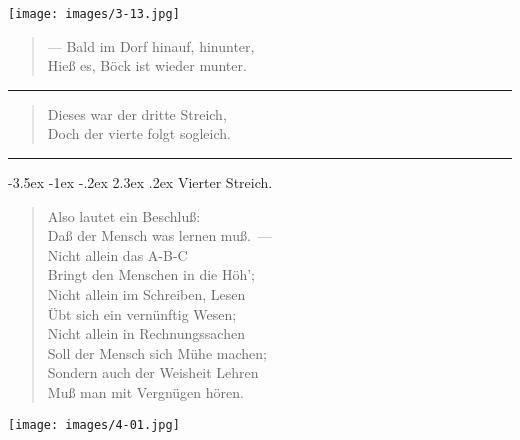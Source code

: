 \documentclass[a4paper,12pt]{article}
\makeatletter
\renewcommand\section{\@startsection {section}{1}{\z@}%
                                   {-3.5ex \@plus -1ex \@minus -.2ex}%
                                   {2.3ex \@plus.2ex}%
                                   {\centering\normalfont\LARGE\bfseries}}
\makeatother
\begin{document}
\begin{center}\texttt{[image: images/3-13.jpg]}\end{center}



\begin{verse}
— Bald im Dorf hinauf, hinunter,\\{}
Hieß es, Böck ist wieder munter.
\end{verse}


\hrule


\begin{verse}
Dieses war der dritte Streich,\\{}
Doch der vierte folgt sogleich.
\end{verse}


\hrule


\clearpage
\section{Vierter Streich.\label{Vierter_Streich}}


\begin{verse}
Also lautet ein Beschluß:\\{}
Daß der Mensch was lernen muß.~—\\{}
Nicht allein das A-B-C\\{}
Bringt den Menschen in die Höh';\\{}
Nicht allein im Schreiben, Lesen\\{}
Übt sich ein vernünftig Wesen;\\{}
Nicht allein in Rechnungssachen\\{}
Soll der Mensch sich Mühe machen;\\{}
Sondern auch der Weisheit Lehren\\{}
Muß man mit Vergnügen hören.
\end{verse}



\begin{center}\texttt{[image: images/4-01.jpg]}\end{center}
\end{document}
